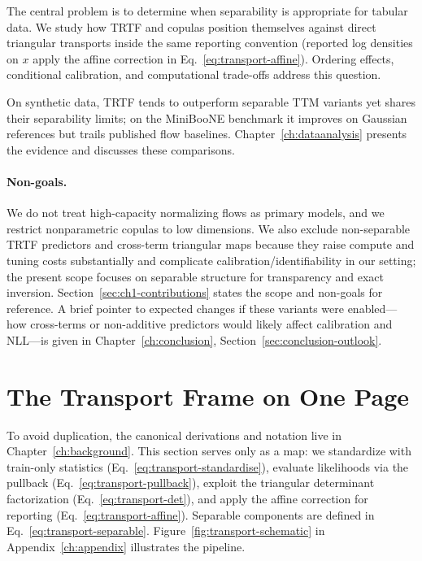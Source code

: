 \documentclass[11pt,a4paper,twoside]{book}\usepackage[]{graphicx}\usepackage[]{xcolor}
\begin{document}
The central problem is to determine when separability is appropriate for tabular data. We study how TRTF and copulas position themselves against direct triangular transports inside the same reporting convention (reported log densities on $x$ apply the affine correction in Eq.~\eqref{eq:transport-affine}). Ordering effects, conditional calibration, and computational trade-offs address this question.
\medskip

On synthetic data, TRTF tends to outperform separable TTM variants yet shares their separability limits; on the MiniBooNE benchmark it improves on Gaussian references but trails published flow baselines. Chapter~\ref{ch:dataanalysis} presents the evidence and discusses these comparisons.

\paragraph{Non-goals.} We do not treat high-capacity normalizing flows as primary models, and we restrict nonparametric copulas to low dimensions. We also exclude non-separable TRTF predictors and cross-term triangular maps because they raise compute and tuning costs substantially and complicate calibration/identifiability in our setting; the present scope focuses on separable structure for transparency and exact inversion. Section~\ref{sec:ch1-contributions} states the scope and non-goals for reference. A brief pointer to expected changes if these variants were enabled—how cross-terms or non-additive predictors would likely affect calibration and NLL—is given in Chapter~\ref{ch:conclusion}, Section~\ref{sec:conclusion-outlook}.

\section{The Transport Frame on One Page}\label{sec:ch1-frame}
To avoid duplication, the canonical derivations and notation live in Chapter~\ref{ch:background}. This section serves only as a map: we standardize with train-only statistics (Eq.~\eqref{eq:transport-standardise}), evaluate likelihoods via the pullback (Eq.~\eqref{eq:transport-pullback}), exploit the triangular determinant factorization (Eq.~\eqref{eq:transport-det}), and apply the affine correction for reporting (Eq.~\eqref{eq:transport-affine}). Separable components are defined in Eq.~\eqref{eq:transport-separable}. Figure~\ref{fig:transport-schematic} in Appendix~\ref{ch:appendix} illustrates the pipeline.
\end{document}

